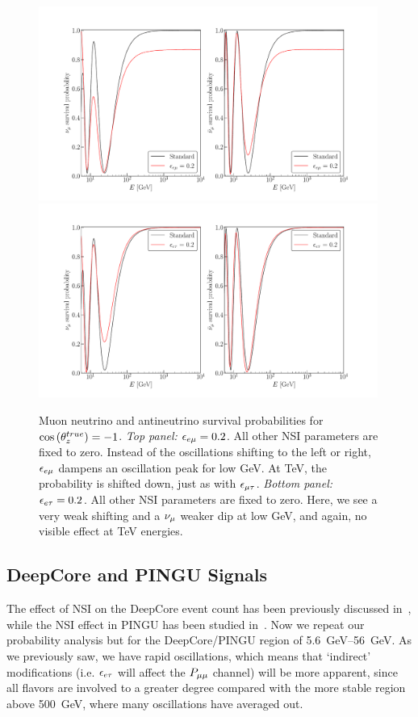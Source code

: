 \begin{figure}
    \begin{center}
        \includegraphics[width=0.99\textwidth]{figures/eem_probs.pdf}
        \includegraphics[width=0.99\textwidth]{figures/eet_probs.pdf}
        \caption{Muon neutrino and antineutrino survival probabilities for
        $\cos{(\theta_z^{true})} = -1$. \emph{Top panel:} $\epsilon_{e\mu} = 0.2$. All other NSI parameters are fixed to zero. Instead of the oscillations shifting to the left or right, $\epsilon_{e\mu}$ dampens an oscillation peak for low \si{\GeV}. At \si{\TeV}, the probability is shifted down, just as with $\epsilon_{\mu\tau}$.
        \emph{Bottom panel:} $\epsilon_{e\tau} = 0.2$. All other NSI parameters are fixed to zero. Here, we see a very weak shifting and a $\nu_\mu$ weaker dip at low \si{\GeV}, and again, no visible effect at \si{TeV} energies. }
        \label{fig:eem_eet_probs}
    \end{center}
\end{figure}


\subsection{DeepCore and PINGU Signals}
The effect of NSI on the DeepCore event count has been previously discussed in~\cite{smirnovNSI}, while the NSI effect 
in PINGU has been studied in~\cite{choubey2014, ohlsson2013}.
Now we repeat our probability analysis but for the DeepCore/PINGU region of \SIrange{5.6}{56}{\GeV}. As we previously saw,
we have rapid oscillations, which means that `indirect' modifications (i.e. $\epsilon_{e\tau}$ will affect the $P_{\mu\mu}$ channel)
will be more apparent, since all flavors are involved to a greater degree compared with the more stable region above \SI{500}{\GeV}, where 
many oscillations have averaged out.

